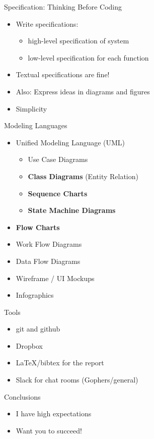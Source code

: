 \documentclass[hyperref={pdfpagelabels=false}, aspectratio=1610]{beamer}
\begin{document}
\begin{frame}
\begin{block}{Specification: Thinking Before Coding}
 \begin{itemize}
  \item Write specifications:
  \begin{itemize}
  	\item high-level specification of system
	\item low-level specification for each function
  \end{itemize}
  \item Textual specifications are fine!
  \item Also: Express ideas in diagrams and figures
  \item Simplicity
 \end{itemize}
\end{block}
\end{frame}


\begin{frame}
\begin{block}{Modeling Languages}
 \begin{itemize}
  \item Unified Modeling Language (UML)
  \begin{itemize}
	\item Use Case Diagrams
  	\item \textbf{Class Diagrams} (Entity Relation)
	\item \textbf{Sequence Charts}
	\item \textbf{State Machine Diagrams}
  \end{itemize}
  \item \textbf{Flow Charts}
  \item Work Flow Diagrams
  \item Data Flow Diagrams
  \item Wireframe / UI Mockups
  \item Infographics
 \end{itemize}
\end{block}
\end{frame}


\begin{frame}
\begin{block}{Tools}
 \begin{itemize}
  \item git and github
  \item Dropbox
  \item LaTeX/bibtex for the report
  \item Slack for chat rooms (Gophers/general)
 \end{itemize}
\end{block}
\end{frame}


\begin{frame}
\begin{block}{Conclusions}
 \begin{itemize}
  \item I have high expectations
  \item Want you to succeed!
 \end{itemize}
\end{block}
\end{frame}
\end{document}

